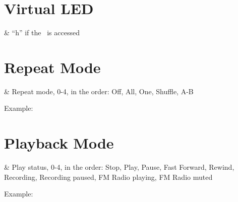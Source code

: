 
\section{Virtual LED}
  \begin{tagmap}
     & ``h'' if the \disk\ is accessed\\
  \end{tagmap}

\section{Repeat Mode}
  \begin{tagmap}
     & Repeat mode, 0-4, in the order: Off, All, One, Shuffle, A-B\\
  \end{tagmap}
Example: 

\section{Playback Mode}
  \begin{tagmap}
     & Play status, 0-4, in the order: Stop, Play, Pause, 
           Fast Forward, Rewind, Recording, Recording paused, FM Radio playing,
           FM Radio muted\\
  \end{tagmap}
Example: 

